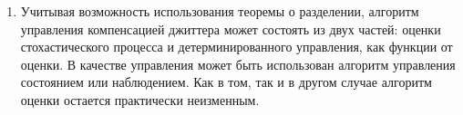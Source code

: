 \begin{enumerate}

 \item Учитывая возможность использования теоремы о разделении, алгоритм управления компенсацией джиттера может состоять из двух частей: оценки стохастического процесса и детерминированного управления, как функции от оценки.
 В качестве управления может быть использован алгоритм управления состоянием или наблюдением.
 Как в том, так и в другом случае алгоритм оценки остается практически неизменным.
 \end{enumerate}



